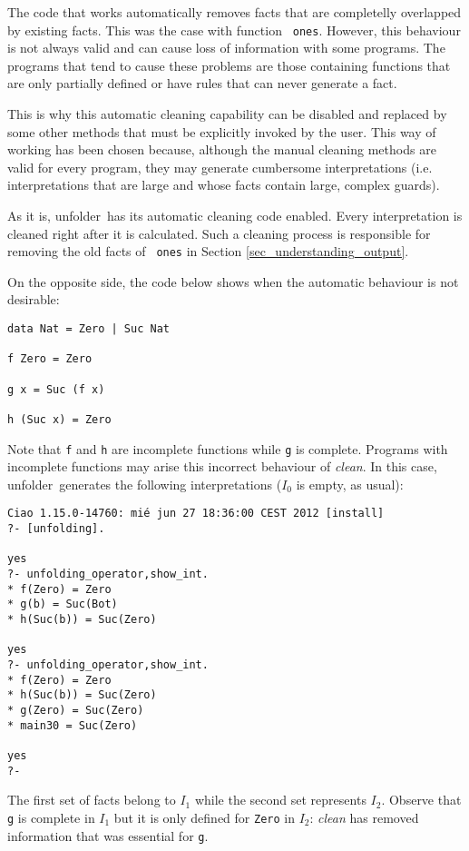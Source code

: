 \documentclass[11pt,a4paper,twoside,openright]{book}
\newcommand{\unfolder}{{\textsf{unfolder~}}}
\begin{document}
The code that works automatically removes facts that are completelly
overlapped by existing facts. This was the case with function {\tt
  ones}. However, this behaviour is not always valid and can cause
loss of information with some programs. The programs that tend to
cause these problems are those containing functions that are only
partially defined or have rules that can never generate a fact.

This is why this automatic cleaning capability can be disabled and
replaced by some other methods that must be explicitly invoked by the
user. This way of working has been chosen because, although the manual
cleaning methods are valid for every program, they may generate
cumbersome interpretations (i.e. interpretations that are large and
whose facts contain large, complex guards).

As it is, \unfolder has its automatic cleaning code enabled. Every
interpretation is cleaned right after it is calculated. Such a
cleaning process is responsible for removing the old facts of {\tt
  ones} in Section \ref{sec_understanding_output}. 

On the opposite side, the code below shows when the automatic
behaviour is not desirable: 

\begin{verbatim}
data Nat = Zero | Suc Nat

f Zero = Zero

g x = Suc (f x)

h (Suc x) = Zero
\end{verbatim}

\noindent
Note that {\tt f} and {\tt h} are incomplete functions while {\tt g}
is complete. Programs with incomplete functions may arise this
incorrect behaviour of {\em clean}. In this case, \unfolder generates
the following interpretations ($I_0$ is empty, as usual):

\begin{verbatim}
Ciao 1.15.0-14760: mié jun 27 18:36:00 CEST 2012 [install]
?- [unfolding].

yes
?- unfolding_operator,show_int.
* f(Zero) = Zero
* g(b) = Suc(Bot)
* h(Suc(b)) = Suc(Zero)

yes
?- unfolding_operator,show_int.
* f(Zero) = Zero
* h(Suc(b)) = Suc(Zero)
* g(Zero) = Suc(Zero)
* main30 = Suc(Zero)

yes
?- 
\end{verbatim}

\noindent
The first set of facts belong to $I_1$ while the second set represents
$I_2$. Observe that {\tt g} is complete in $I_1$ but it is only defined for
{\tt Zero} in $I_2$: {\em clean} has removed information that was
essential for {\tt g}.
\end{document}
